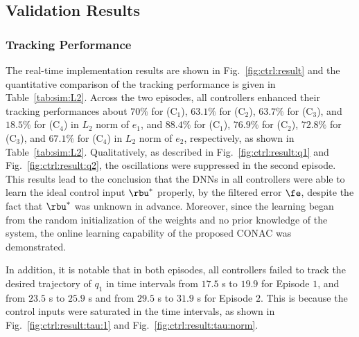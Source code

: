 \documentclass[lettersize,journal]{IEEEtran}
\begin{document}
\subsection{Validation Results}

\subsubsection{Tracking Performance}

The real-time implementation results are shown in Fig.~\ref{fig:ctrl:result} and the quantitative comparison of the tracking performance is given in Table~\ref{tab:sim:L2}.
Across the two episodes, all controllers enhanced their tracking performances about $70 \%$ for (C$_1$), $63.1 \%$ for (C$_2$), $63.7 \%$ for (C$_3$), and $18.5 \%$ for (C$_4$) in $L_2$ norm of $e_1$, and $88.4 \%$ for (C$_1$), $76.9 \%$ for (C$_2$), $72.8 \%$ for (C$_3$), and $67.1 \%$ for (C$_4$) in $L_2$ norm of $e_2$, respectively, as shown in Table~\ref{tab:sim:L2}.
Qualitatively, as described in Fig.~\ref{fig:ctrl:result:q1} and Fig.~\ref{fig:ctrl:result:q2}, the oscillations were suppressed in the second episode.
This results lead to the conclusion that the DNNs in all controllers were able to learn the ideal control input $\rbu^*$ properly, by the filtered error $\fe$, despite the fact that $\rbu^*$ was unknown in advance.
Moreover, since the learning began from the random initialization of the weights and no prior knowledge of the system, the online learning capability of the proposed CONAC was demonstrated.

In addition, it is notable that in both episodes, all controllers failed to track the desired trajectory of $q_1$ in time intervals from $17.5$ s to $19.9$ for Episode $1$, and from $23.5$ s to $25.9$ s and from $29.5$ s to $31.9$ s for Episode $2$.
This is because the control inputs were saturated in the time intervals, as shown in Fig.~\ref{fig:ctrl:result:tau:1} and Fig.~\ref{fig:ctrl:result:tau:norm}.
\end{document}
